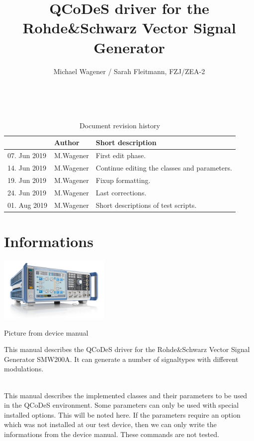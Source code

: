 \documentclass[11pt]{article} %
\title{QCoDeS driver for the Rohde\&Schwarz Vector Signal Generator \newline {\it User documentation}}
\author{Michael Wagener / Sarah Fleitmann, FZJ/ZEA-2}
\begin{document}
\maketitle

\tableofcontents %

\ \\

\begin{longtable}{|p{2.7cm}|p{2.6cm}|p{10.3cm}|}
\caption{Document revision history} \\
\hline\rowcolor{rowcolor}{\bf Date} & {\bf Author} & {\bf Short description} \\
\endfirsthead
\hline
07. Jun 2019 & M.Wagener & First edit phase. \\ \hline
14. Jun 2019 & M.Wagener & Continue editing the classes and parameters. \\ \hline
19. Jun 2019 & M.Wagener & Fixup formatting. \\ \hline
24. Jun 2019 & M.Wagener & Last corrections. \\ \hline
01. Aug 2019 & M.Wagener & Short descriptions of test scripts. \\ \hline
\end{longtable}


\clearpage

\section{Informations}

\begin{floatingfigure}[r]{0.42\textwidth}
\mbox{\includegraphics[width=0.4\textwidth]{DeviceFromHandbook.png}}
\caption{Picture from device manual}
\end{floatingfigure}
This manual describes the QCoDeS driver for the Rohde\&Schwarz Vector Signal Generator SMW200A.
It can generate a number of signaltypes with different modulations.

\ \\

This manual describes the implemented classes and their parameters to be used	 in the QCoDeS environment. Some parameters can only be used with special installed options. This will be noted here. If the parameters require an option which was not installed at our test device, then we can only write the informations from the device manual. These commands are not tested.
\end{document}
